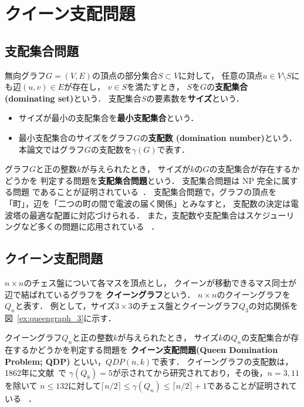 \chapter{クイーン支配問題}\label{chap:background}

\section{支配集合問題}
無向グラフ$G=(V,E)$の頂点の部分集合$S\subset V$に対して，
任意の頂点$u \in V\setminus S$にも辺$(u,v) \in E$が存在し，
$v \in S$を満たすとき，
$S$を$G$の\textbf{支配集合 (dominating set)}という．
支配集合$S$の要素数を\textbf{サイズ}という．
 \begin{itemize}
  \item サイズが最小の支配集合を\textbf{最小支配集合}という．
  \item 最小支配集合のサイズをグラフ$G$の\textbf{支配数 (domination number)}という．
    本論文ではグラフ$G$の支配数を$\gamma(G)$で表す．
 \end{itemize}

グラフ$G$と正の整数$k$が与えられたとき，
サイズが$k$の$G$の支配集合が存在するかどうかを
判定する問題を\textbf{支配集合問題}という．
支配集合問題は NP 完全に属する問題
であることが証明されている~\cite{Jhonson79}．
支配集合問題で，グラフの頂点を「町」，辺を「二つの町の間で電波の届く関係」とみなすと，
支配数の決定は電波塔の最適な配置に対応づけられる．
また，支配数や支配集合はスケジューリングなど多くの問題に応用されている
~\cite{Haynes98,Haynes98Advanced}．

\section{クイーン支配問題}
$n\times n$のチェス盤について各マスを頂点とし，
クイーンが移動できるマス同士が辺で結ばれているグラフを
\textbf{クイーングラフ}という．
$n\times n$のクイーングラフを$Q_n$と表す．
例として，サイズ$3 \times 3$のチェス盤とクイーングラフ$Q_3$の対応関係を
図~\ref{ex:queengraph_3}に示す．

クイーングラフ$Q_n$と正の整数$k$が与えられたとき，
サイズ$k$の$Q_n$の支配集合が存在するかどうかを判定する問題を
\textbf{クイーン支配問題(Queen Domination Problem; QDP)}
といい，$QDP(n,k)$で表す．
クイーングラフの支配数は，1862年に文献~\cite{Jaenisch62}で
$\gamma(Q_8)=5$が示されてから研究されており，その後，$n=3,11$を除いて
$n \leq 132$に対して$\lceil n/2 \rceil \leq \gamma(Q_n) 
\leq \lceil n/2 \rceil +1 $であることが証明されている
~\cite{Ostergard01}．

